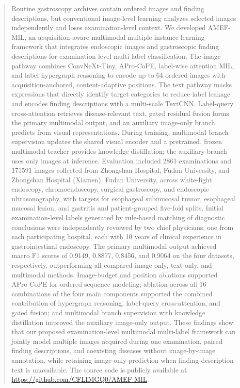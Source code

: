 \documentclass[Afour,sagev,times]{sagej}
\begin{document}
\begin{abstract}
Routine gastroscopy archives contain ordered images and finding descriptions, but conventional image-level learning analyzes selected images independently and loses examination-level context. We developed AMEF-MIL, an acquisition-aware multimodal multiple instance learning framework that integrates endoscopic images and gastroscopic finding descriptions for examination-level multi-label classification. The image pathway combines ConvNeXt-Tiny, APro-CoPE, label-wise attention MIL, and label hypergraph reasoning to encode up to 64 ordered images with acquisition-anchored, content-adaptive positions. The text pathway masks expressions that directly identify target categories to reduce label leakage and encodes finding descriptions with a multi-scale TextCNN. Label-query cross-attention retrieves disease-relevant text, gated residual fusion forms the primary multimodal output, and an auxiliary image-only branch predicts from visual representations. During training, multimodal branch supervision updates the shared visual encoder and a pretrained, frozen multimodal teacher provides knowledge distillation; the auxiliary branch uses only images at inference. Evaluation included 2861 examinations and 171591 images collected from Zhongshan Hospital, Fudan University, and Zhongshan Hospital (Xiamen), Fudan University, across white-light endoscopy, chromoendoscopy, surgical gastroscopy, and endoscopic ultrasonography, with targets for esophageal submucosal tumor, esophageal mucosal lesion, and gastritis and patient-grouped five-fold splits. Initial examination-level labels generated by rule-based matching of diagnostic conclusions were independently reviewed by two chief physicians, one from each participating hospital, each with 10 years of clinical experience in gastrointestinal endoscopy. The primary multimodal output achieved macro F1 scores of 0.9149, 0.8877, 0.8456, and 0.9064 on the four datasets, respectively, outperforming all compared image-only, text-only, and multimodal methods. Image-budget and position ablations supported APro-CoPE for ordered sequence modeling; ablation across all 16 combinations of the four main components supported the combined contribution of hypergraph reasoning, label-query cross-attention, and gated fusion; and multimodal branch supervision with knowledge distillation improved the auxiliary image-only output. These findings show that our proposed examination-level multimodal multi-label framework can jointly model multiple images acquired during one examination, paired finding descriptions, and coexisting diseases without image-by-image annotation, while retaining image-only prediction when finding-description text is unavailable. The source code is publicly available at \url{https://github.com/CFLIMGQ0/AMEF-MIL}.
\end{abstract}
\end{document}
